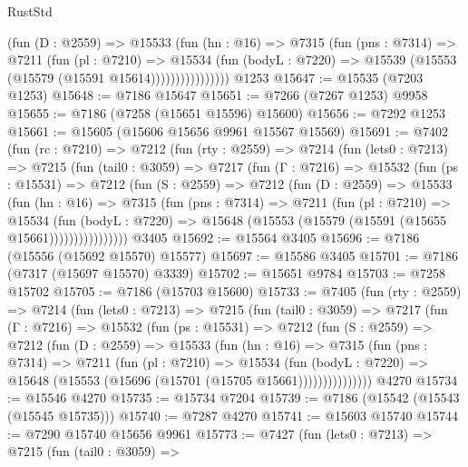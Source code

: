 \begin{lexlean}{RustStd}
\begin{coremodule}
                    (fun (D : @2559) =>
                    @15533
                      (fun (hn : @16) =>
                      @7315
                        (fun (pns : @7314) =>
                        @7211
                          (fun (pl : @7210) =>
                          @15534
                            (fun (bodyL : @7220) =>
                            @15539 (@15553 (@15579 (@15591 @15614))))))))))))))))
    @1253
@15647 := @15535 (@7203 @1253)
@15648 := @7186 @15647
@15651 := @7266 (@7267 @1253) @9958
@15655 := @7186 (@7258 (@15651 @15596) @15600)
@15656 := @7292 @1253
@15661 := @15605 (@15606 @15656 @9961 @15567 @15569)
@15691 := @7402
    (fun (rc : @7210) =>
    @7212
      (fun (rty : @2559) =>
      @7214
        (fun (lets0 : @7213) =>
        @7215
          (fun (tail0 : @3059) =>
          @7217
            (fun (Γ : @7216) =>
            @15532
              (fun (ps : @15531) =>
              @7212
                (fun (S : @2559) =>
                @7212
                  (fun (D : @2559) =>
                  @15533
                    (fun (hn : @16) =>
                    @7315
                      (fun (pns : @7314) =>
                      @7211
                        (fun (pl : @7210) =>
                        @15534
                          (fun (bodyL : @7220) =>
                          @15648 (@15553 (@15579 (@15591 (@15655 @15661))))))))))))))))
    @3405
@15692 := @15564 @3405
@15696 := @7186 (@15556 (@15692 @15570) @15577)
@15697 := @15586 @3405
@15701 := @7186 (@7317 (@15697 @15570) @3339)
@15702 := @15651 @9784
@15703 := @7258 @15702
@15705 := @7186 (@15703 @15600)
@15733 := @7405
    (fun (rty : @2559) =>
    @7214
      (fun (lets0 : @7213) =>
      @7215
        (fun (tail0 : @3059) =>
        @7217
          (fun (Γ : @7216) =>
          @15532
            (fun (ps : @15531) =>
            @7212
              (fun (S : @2559) =>
              @7212
                (fun (D : @2559) =>
                @15533
                  (fun (hn : @16) =>
                  @7315
                    (fun (pns : @7314) =>
                    @7211
                      (fun (pl : @7210) =>
                      @15534
                        (fun (bodyL : @7220) =>
                        @15648 (@15553 (@15696 (@15701 (@15705 @15661)))))))))))))))
    @4270
@15734 := @15546 @4270
@15735 := @15734 @7204
@15739 := @7186 (@15542 (@15543 (@15545 @15735)))
@15740 := @7287 @4270
@15741 := @15603 @15740
@15744 := @7290 @15740 @15656 @9961
@15773 := @7427
    (fun (lets0 : @7213) =>
    @7215
      (fun (tail0 : @3059) =>

\end{coremodule}
\end{lexlean}
